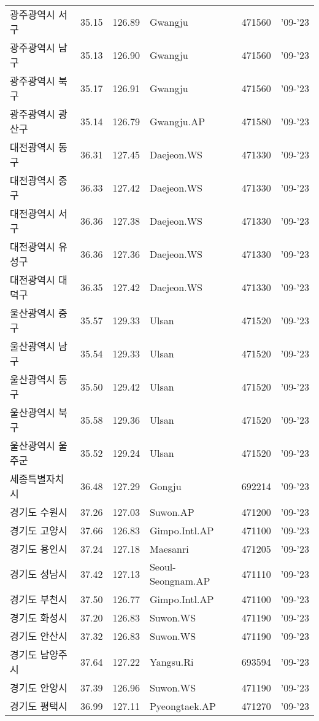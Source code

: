 \begin{longtable}{lcclcc}
  광주광역시 서구 & 35.15 & 126.89 & Gwangju & 471560 & '09-'23 \\
  광주광역시 남구 & 35.13 & 126.90 & Gwangju & 471560 & '09-'23 \\
  광주광역시 북구 & 35.17 & 126.91 & Gwangju & 471560 & '09-'23 \\
  광주광역시 광산구 & 35.14 & 126.79 & Gwangju.AP & 471580 & '09-'23 \\
  대전광역시 동구 & 36.31 & 127.45 & Daejeon.WS & 471330 & '09-'23 \\
  대전광역시 중구 & 36.33 & 127.42 & Daejeon.WS & 471330 & '09-'23 \\
  대전광역시 서구 & 36.36 & 127.38 & Daejeon.WS & 471330 & '09-'23 \\
  대전광역시 유성구 & 36.36 & 127.36 & Daejeon.WS & 471330 & '09-'23 \\
  대전광역시 대덕구 & 36.35 & 127.42 & Daejeon.WS & 471330 & '09-'23 \\
  울산광역시 중구 & 35.57 & 129.33 & Ulsan & 471520 & '09-'23 \\
  울산광역시 남구 & 35.54 & 129.33 & Ulsan & 471520 & '09-'23 \\
  울산광역시 동구 & 35.50 & 129.42 & Ulsan & 471520 & '09-'23 \\
  울산광역시 북구 & 35.58 & 129.36 & Ulsan & 471520 & '09-'23 \\
  울산광역시 울주군 & 35.52 & 129.24 & Ulsan & 471520 & '09-'23 \\
  세종특별자치시 & 36.48 & 127.29 & Gongju & 692214 & '09-'23 \\
  경기도 수원시 & 37.26 & 127.03 & Suwon.AP & 471200 & '09-'23 \\
  경기도 고양시 & 37.66 & 126.83 & Gimpo.Intl.AP & 471100 & '09-'23 \\
  경기도 용인시 & 37.24 & 127.18 & Maesanri & 471205 & '09-'23 \\
  경기도 성남시 & 37.42 & 127.13 & Seoul-Seongnam.AP & 471110 & '09-'23 \\
  경기도 부천시 & 37.50 & 126.77 & Gimpo.Intl.AP & 471100 & '09-'23 \\
  경기도 화성시 & 37.20 & 126.83 & Suwon.WS & 471190 & '09-'23 \\
  경기도 안산시 & 37.32 & 126.83 & Suwon.WS & 471190 & '09-'23 \\
  경기도 남양주시 & 37.64 & 127.22 & Yangsu.Ri & 693594 & '09-'23 \\
  경기도 안양시 & 37.39 & 126.96 & Suwon.WS & 471190 & '09-'23 \\
  경기도 평택시 & 36.99 & 127.11 & Pyeongtaek.AP & 471270 & '09-'23 \\

\end{longtable}
